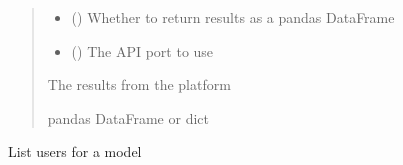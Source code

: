 \documentclass[letterpaper,10pt,english]{sphinxmanual}
\begin{document}
\begin{fulllineitems}
\begin{fulllineitems}
\begin{quote}
\begin{description}
\begin{itemize}
\item {} 
\sphinxAtStartPar
{} (\sphinxstyleliteralemphasis{\sphinxupquote{ (}}\sphinxstyleliteralemphasis{\sphinxupquote{)}}) \textendash{} Whether to return results as a pandas DataFrame

\item {} 
\sphinxAtStartPar
{} (\sphinxstyleliteralemphasis{\sphinxupquote{ (}}\sphinxstyleliteralemphasis{\sphinxupquote{)}}) \textendash{} The API port to use

\end{itemize}

\sphinxAtStartPar
{} \textendash{} The results from the platform

\sphinxAtStartPar
pandas DataFrame or dict

\end{description}\end{quote}

\end{fulllineitems}


\begin{fulllineitems}
\label{\detokenize{aisquared.platform:aisquared.platform.AISquaredPlatformClient.AISquaredPlatformClient.list_model_users}}
\pysigstartsignatures
{}
\pysigstopsignatures
\sphinxAtStartPar
List users for a model


\end{fulllineitems}
\end{fulllineitems}
\end{document}
